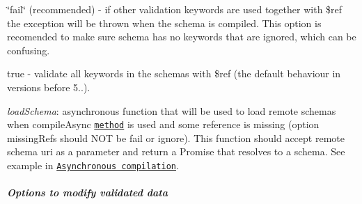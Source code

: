 \begin{DoxyItemize}
\begin{DoxyItemize}
\item {\ttfamily \char`\"{}fail\char`\"{}} (recommended) -\/ if other validation keywords are used together with {\ttfamily \$ref} the exception will be thrown when the schema is compiled. This option is recomended to make sure schema has no keywords that are ignored, which can be confusing.
\item {\ttfamily true} -\/ validate all keywords in the schemas with {\ttfamily \$ref} (the default behaviour in versions before 5..).
\end{DoxyItemize}
\item {\itshape load\+Schema}\+: asynchronous function that will be used to load remote schemas when {\ttfamily compile\+Async} \href{#api-compileAsync}{\tt method} is used and some reference is missing (option {\ttfamily missing\+Refs} should N\+OT be \textquotesingle{}fail\textquotesingle{} or \textquotesingle{}ignore\textquotesingle{}). This function should accept remote schema uri as a parameter and return a Promise that resolves to a schema. See example in \href{#asynchronous-schema-compilation}{\tt Asynchronous compilation}.
\end{DoxyItemize}

\subparagraph*{Options to modify validated data}


